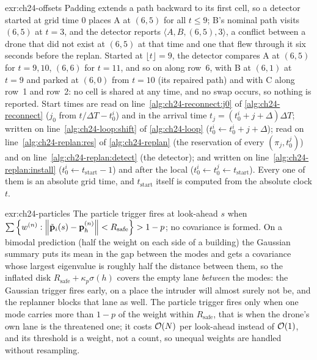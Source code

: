 \begin{solution}{exr:ch24-offsets}
Padding extends a path backward to its first cell, so a detector started at grid time $0$ places A at $(6,5)$ for all $t \le 9$; B's nominal path visits $(6,5)$ at $t = 3$, and the detector reports $\langle A, B, (6,5), 3\rangle$, a conflict between a drone that did not exist at $(6,5)$ at that time and one that flew through it six seconds before the replan. Started at $\lfloor t \rfloor = 9$, the detector compares A at $(6,5)$ for $t = 9, 10$, $(6,6)$ for $t = 11$, and so on along row~6, with B at $(6,1)$ at $t = 9$ and parked at $(6,0)$ from $t = 10$ (its repaired path) and with C along row~1 and row~2: no cell is shared at any time, and no swap occurs, so nothing is reported. Start times are read on line~\ref{alg:ch24-reconnect:j0} of \cref{alg:ch24-reconnect} ($j_0$ from $t/\Delta T - t_0^i$) and in the arrival time $t_j = (t_0^i + j + \Delta)\Delta T$; written on line~\ref{alg:ch24-loop:shift} of \cref{alg:ch24-loop} ($t_0^i \gets t_0^i + j + \Delta$); read on line~\ref{alg:ch24-replan:res} of \cref{alg:ch24-replan} (the reservation of every $(\pi_j, t_0^j)$) and on line~\ref{alg:ch24-replan:detect} (the detector); and written on line~\ref{alg:ch24-replan:install} ($t_0^i \gets t_{\mathrm{start}} - 1$) and after the local \cbs ($t_0^i \gets t_0^j \gets t_{\mathrm{start}}$). Every one of them is an absolute grid time, and $t_{\mathrm{start}}$ itself is computed from the absolute clock $t$.
\end{solution}

\begin{solution}{exr:ch24-particles}
The particle trigger fires at look-ahead $s$ when $\sum \left\{ w^{(n)} : \left\lVert \tilde{\mathbf{p}}_i(s) - \mathbf{p}^{(n)}_h \right\rVert < R_{\mathrm{safe}} \right\} > 1 - p$; no covariance is formed. On a bimodal prediction (half the weight on each side of a building) the Gaussian summary puts its mean in the gap between the modes and gets a covariance whose largest eigenvalue is roughly half the distance between them, so the inflated disk $R_{\mathrm{safe}} + \kappa_p\sigma(h)$ covers the empty lane \emph{between} the modes: the Gaussian trigger fires early, on a place the intruder will almost surely not be, and the replanner blocks that lane as well. The particle trigger fires only when one mode carries more than $1 - p$ of the weight within $R_{\mathrm{safe}}$, that is when the drone's own lane is the threatened one; it costs $\mathcal{O}\!\left(N\right)$ per look-ahead instead of $\mathcal{O}\!\left(1\right)$, and its threshold is a weight, not a count, so unequal weights are handled without resampling.
\end{solution}

